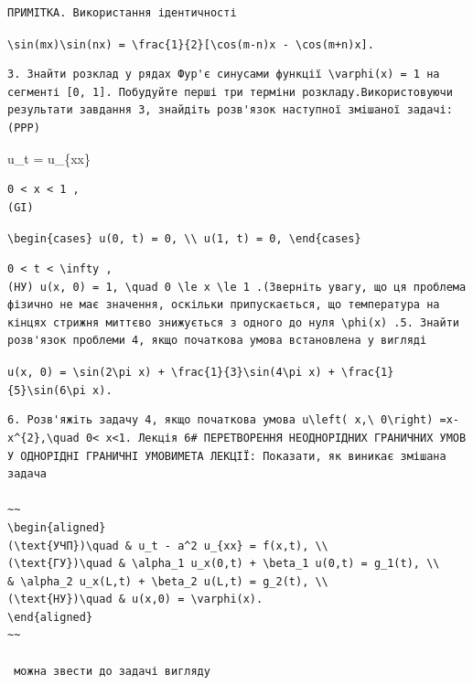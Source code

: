 \documentclass[
  ukrainian,
]{article}
\begin{document}
\begin{verbatim}
ПРИМІТКА. Використання ідентичності
\end{verbatim}

\texttt{\textbackslash{}sin(mx)\textbackslash{}sin(nx)\ =\ \textbackslash{}frac\{1\}\{2\}{[}\textbackslash{}cos(m-n)x\ -\ \textbackslash{}cos(m+n)x{]}.}

\begin{verbatim}
3. Знайти розклад у рядах Фур'є синусами функції \varphi(x) = 1 на сегменті [0, 1]. Побудуйте перші три терміни розкладу.Використовуючи результати завдання 3, знайдіть розв'язок наступної змішаної задачі:(PPP)
\end{verbatim}

u\_t = u\_\{xx\}

\begin{verbatim}
0 < x < 1 , 
(GI)
\end{verbatim}

\texttt{\textbackslash{}begin\{cases\}\ u(0,\ t)\ =\ 0,\ \textbackslash{}\textbackslash{}\ u(1,\ t)\ =\ 0,\ \textbackslash{}end\{cases\}}

\begin{verbatim}
0 < t < \infty , 
(НУ) u(x, 0) = 1, \quad 0 \le x \le 1 .(Зверніть увагу, що ця проблема фізично не має значення, оскільки припускається, що температура на кінцях стрижня миттєво знижується з одного до нуля \phi(x) .5. Знайти розв'язок проблеми 4, якщо початкова умова встановлена у вигляді
\end{verbatim}

\texttt{u(x,\ 0)\ =\ \textbackslash{}sin(2\textbackslash{}pi\ x)\ +\ \textbackslash{}frac\{1\}\{3\}\textbackslash{}sin(4\textbackslash{}pi\ x)\ +\ \textbackslash{}frac\{1\}\{5\}\textbackslash{}sin(6\textbackslash{}pi\ x).}

\begin{verbatim}
6. Розв'яжіть задачу 4, якщо початкова умова u\left( x,\ 0\right) =x-x^{2},\quad 0< x<1. Лекція 6# ПЕРЕТВОРЕННЯ НЕОДНОРІДНИХ ГРАНИЧНИХ УМОВ У ОДНОРІДНІ ГРАНИЧНІ УМОВИМЕТА ЛЕКЦІЇ: Показати, як виникає змішана задача 

~~
\begin{aligned}
(\text{УЧП})\quad & u_t - a^2 u_{xx} = f(x,t), \\
(\text{ГУ})\quad & \alpha_1 u_x(0,t) + \beta_1 u(0,t) = g_1(t), \\
& \alpha_2 u_x(L,t) + \beta_2 u(L,t) = g_2(t), \\
(\text{НУ})\quad & u(x,0) = \varphi(x).
\end{aligned}
~~

 можна звести до задачі вигляду
\end{verbatim}
\end{document}
